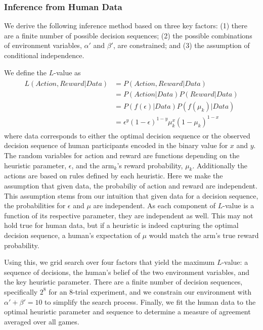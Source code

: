 \subsubsection{Inference from Human Data}
We derive the following inference method based on three key factors: (1) there are a finite number of possible decision sequences; (2) the possible combinations of environment variables, $\alpha'$ and $\beta'$, are constrained; and (3) the assumption of conditional independence.

We define the $L$-value as 
\begin{align}
\begin{split}
	\label{eq:likelihood}
	L(Action,Reward|Data) &= P(Action,Reward|Data) \\
						  &= P(Action|Data) P(Reward|Data) \\
						  &= P(f(\epsilon)|Data) P(f(\mu_k)|Data) \\
						  &= \epsilon^y (1-\epsilon)^{1-y} \mu_k^x (1-\mu_k)^{1-x}
\end{split}
\end{align}
where data corresponds to either the optimal decision sequence or the observed decision sequence of human participants encoded in the binary value for $x$ and $y$. The random variables for action and reward are functions depending on the heuristic parameter, $\epsilon$, and the arm$_k$'s reward probability, $\mu_k$. Additionally the actions are based on rules defined by each heuristic. Here we make the assumption that given data, the probabiliy of action and reward are independent. This assumption stems from our intuition that given data for a decision sequence, the probabilities for $\epsilon$ and $\mu$ are independent. As each component of $L$-value is a function of its respective parameter, they are independent as well. This may not hold true for human data, but if a heuristic is indeed capturing the optimal decision sequence, a human's expectation of $\mu$ would match the arm's true reward probability.

Using this, we grid search over four factors that yield the maximum $L$-value: a sequence of decisions, the human's belief of the two environment variables, and the key heuristic parameter. There are a finite number of decision sequences, specifically $2^8$ for an 8-trial experiment, and we constrain our environment with $\alpha'+\beta'=10$ to simplify the search process. Finally, we fit the human data to the optimal heuristic parameter and sequence to determine a measure of agreement averaged over all games.




